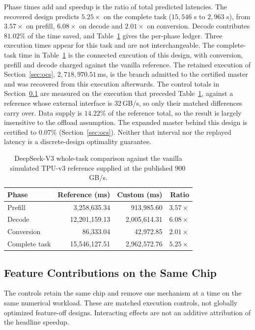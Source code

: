 Phase times add and speedup is the ratio of total predicted latencies.
The recovered design predicts $\mathbf{5.25\times}$ on the complete task ($15{,}546$ s to $2{,}963$ s), from $3.57\times$ on prefill, $6.08\times$ on decode and $2.01\times$ on conversion.
Decode contributes $81.02\%$ of the time saved, and Table~\ref{tab:deepseek_vanilla} gives the per-phase ledger.
Three execution times appear for this task and are not interchangeable.
The complete-task time in Table~\ref{tab:deepseek_vanilla} is the connected execution of this design, with conversion, prefill and decode charged against the vanilla reference.
The retained execution of Section~\ref{sec:ocs}, $2{,}718{,}970.51$\,ms, is the branch admitted to the certified master and was recovered from this execution afterwards.
The control totals in Section~\ref{sec:native_features} are measured on the execution that preceded Table~\ref{tab:deepseek_vanilla}, against a reference whose external interface is 32\,GB/s, so only their matched differences carry over.
Data supply is $14.22\%$ of the reference total, so the result is largely insensitive to the offload assumption.
The expanded master behind this design is certified to $0.07\%$ (Section~\ref{sec:ocs}).
Neither that interval nor the replayed latency is a discrete-design optimality guarantee.
\begin{table}[h]
\centering\small
\caption{DeepSeek-V3 whole-task comparison against the vanilla simulated TPU-v3
reference supplied at the published 900\,GB/s.}
\label{tab:deepseek_vanilla}
\begin{tabular}{@{}lrrr@{}}
\toprule
Phase & Reference (ms) & Custom (ms) & Ratio \\
\midrule
Prefill       & 3{,}258{,}635.34  & 913{,}985.60     & $3.57\times$ \\
Decode        & 12{,}201{,}159.13 & 2{,}005{,}614.31 & $6.08\times$ \\
Conversion    & 86{,}333.04       & 42{,}972.85      & $2.01\times$ \\
\midrule
Complete task & 15{,}546{,}127.51 & 2{,}962{,}572.76 & $\mathbf{5.25\times}$ \\
\bottomrule
\end{tabular}
\end{table}

\subsection{Feature Contributions on the Same Chip}
\label{sec:native_features}
The controls retain the same chip and remove one mechanism at a time on the same numerical workload.
These are matched execution controls, not globally optimized feature-off designs.
Interacting effects are not an additive attribution of the headline speedup.

